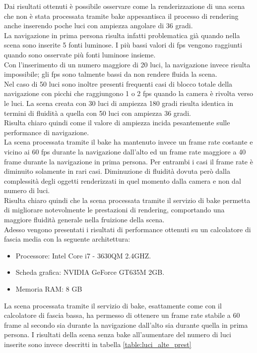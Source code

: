 Dai risultati ottenuti è possibile osservare come la renderizzazione di una scena che non è stata processata tramite bake appesantisca il processo di rendering anche inserendo poche luci con ampiezza angolare di 36 gradi.
\\
La navigazione in prima persona risulta infatti problematica già quando nella scena sono inserite 5 fonti luminose. I più bassi valori di fps vengono raggiunti quando sono osservate più fonti luminose insieme.
\\
Con l’inserimento di un numero maggiore di 20 luci, la navigazione invece risulta impossibile; gli fps sono talmente bassi da non rendere fluida la scena.
\\
Nel caso di 50 luci sono inoltre presenti frequenti casi di blocco totale della navigazione con picchi che raggiungono 1 o 2 fps quando la camera è rivolta verso le luci.
La scena creata con 30 luci di ampiezza 180 gradi risulta identica in termini di fluidità a quella con 50 luci con ampiezza 36 gradi. 
\\
Risulta chiaro quindi come il valore di ampiezza incida pesantemente sulle performance di navigazione.
\\
La scena processata tramite il bake ha mantenuto invece un frame rate costante e vicino ai 60 fps durante la navigazione dall’alto ed un frame rate maggiore a 40 frame durante la navigazione in prima persona. Per entrambi i casi il frame rate è diminuito solamente in rari casi. Diminuzione di fluidità dovuta però dalla complessità degli oggetti renderizzati in quel momento dalla camera e non dal numero di luci.
\\
Risulta chiaro quindi che la scena processata tramite il servizio di bake permetta di migliorare notevolmente le prestazioni di rendering, comportando una maggiore fluidità generale nella fruizione della scena. 
\\
Adesso vengono presentati i risultati di performance ottenuti su un calcolatore di fascia media con la seguente architettura:
\begin{itemize}
\item Processore: Intel Core i7 - 3630QM 2.4GHZ.
\item Scheda grafica: NVIDIA GeForce GT635M 2GB.
\item Memoria RAM: 8 GB
\end{itemize}

La scena processata tramite il servizio di bake, esattamente come con il calcolatore di fascia bassa, ha permesso di ottenere un frame rate stabile a 60 frame al secondo sia durante la navigazione dall'alto sia durante quella in prima persona.
I risultati della scena senza bake all'aumentare del numero di luci inserite sono invece descritti in tabella \ref{table:luci_alte_prest} 

